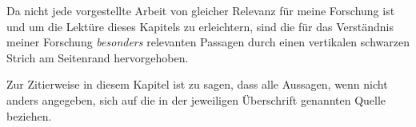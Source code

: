 \begin{important}
Da nicht jede vorgestellte Arbeit von gleicher Relevanz für meine Forschung ist und um die Lektüre dieses Kapitels zu erleichtern, sind die für das Verständnis meiner Forschung \textit{besonders} relevanten Passagen durch einen vertikalen schwarzen Strich am Seitenrand hervorgehoben.
\end{important}

Zur Zitierweise in diesem Kapitel ist zu sagen, dass alle Aussagen, wenn nicht anders angegeben, sich auf die in der jeweiligen Überschrift genannten Quelle beziehen.











